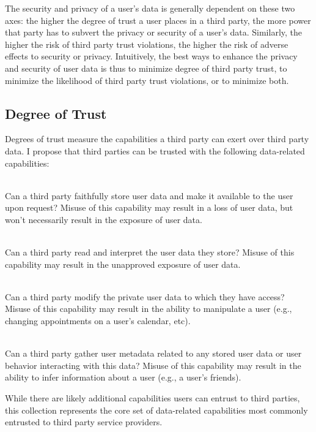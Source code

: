The security and privacy of a user's data is generally dependent on
these two axes: the higher the degree of trust a user places in a
third party, the more power that party has to subvert the privacy or
security of a user's data. Similarly, the higher the risk of third
party trust violations, the higher the risk of adverse effects to
security or privacy.  Intuitively, the best ways to enhance the
privacy and security of user data is thus to minimize degree of third
party trust, to minimize the likelihood of third party trust
violations, or to minimize both.

\subsection{Degree of Trust}

Degrees of trust measure the capabilities a third party can exert over
third party data. I propose that third parties can be trusted with the
following data-related capabilities:

\begin{packed_desc}
\item[Storage (S-Capability):] \hfill \\ Can a third party faithfully
  store user data and make it available to the user upon request?
  Misuse of this capability may result in a loss of user data, but
  won't necessarily result in the exposure of user data.
\item[Access (R-Capability):] \hfill \\ Can a third party read and
  interpret the user data they store? Misuse of this capability may
  result in the unapproved exposure of user data.
\item[Manipulation (W-Capability):] \hfill \\ Can a third party modify
  the private user data to which they have access? Misuse of this
  capability may result in the ability to manipulate a user
  (e.g., changing appointments on a user's calendar, etc).
\item[Meta-analysis (M-Capability):] \hfill \\ Can a third party
  gather user metadata related to any stored user data or user
  behavior interacting with this data? Misuse of this capability may
  result in the ability to infer information about a user (e.g., a
  user's friends).
\end{packed_desc}

While there are likely additional capabilities users can entrust to
third parties, this collection represents the core set of data-related
capabilities most commonly entrusted to third party service providers.

